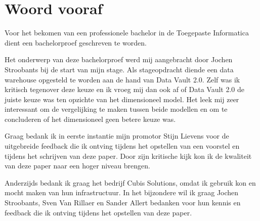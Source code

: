 
\chapter*{Woord vooraf}
\label{ch:voorwoord}


Voor het bekomen van een professionele bachelor in de Toegepaste Informatica dient een bachelorproef geschreven te worden. 

Het onderwerp van deze bachelorproef werd mij aangebracht door Jochen Stroobants bij de start van mijn stage. Als stageopdracht diende een data warehouse opgesteld te worden aan de hand van Data Vault 2.0. Zelf was ik kritisch tegenover deze keuze en ik vroeg mij dan ook af of Data Vault 2.0 de juiste keuze was ten opzichte van het dimensioneel model. Het leek mij zeer interessant om de vergelijking te maken tussen beide modellen en om te concluderen of het dimensioneel geen betere keuze was.

Graag bedank ik in eerste instantie mijn promotor Stijn Lievens voor de uitgebreide feedback die ik ontving tijdens het opstellen van een voorstel en tijdens het schrijven van deze paper. Door zijn kritische kijk kon ik de kwaliteit van deze paper naar een hoger niveau brengen. 

Anderzijds bedank ik graag het bedrijf Cubis Solutions, omdat ik gebruik kon en mocht maken van hun infrastructuur. In het bijzondere wil ik graag Jochen Stroobants, Sven Van Rillaer en Sander Allert bedanken voor hun kennis en feedback die ik ontving tijdens het opstellen van deze paper.